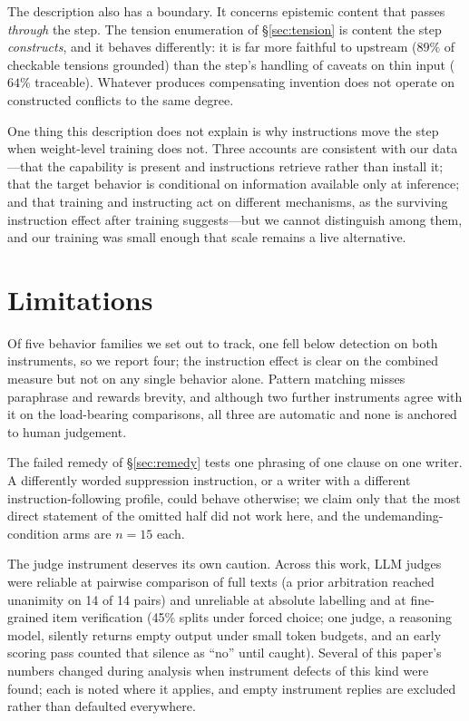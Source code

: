 \documentclass[11pt]{article}
\begin{document}
The description also has a boundary. It concerns epistemic content that
passes \emph{through} the step. The tension enumeration of
\S\ref{sec:tension} is content the step \emph{constructs}, and it behaves
differently: it is far more faithful to upstream ($89\%$ of checkable
tensions grounded) than the step's handling of caveats on thin input ($64\%$
traceable). Whatever produces compensating invention does not operate on
constructed conflicts to the same degree.

One thing this description does not explain is why instructions move the step
when weight-level training does not. Three accounts are consistent with our
data---that the capability is present and instructions retrieve rather than
install it; that the target behavior is conditional on information available
only at inference; and that training and instructing act on different
mechanisms, as the surviving instruction effect after training suggests---but
we cannot distinguish among them, and our training was small enough that scale
remains a live alternative.

\section{Limitations}
\label{sec:limits}
Of five behavior families we set out to track, one fell below detection on
both instruments, so we report four; the instruction effect is clear on the
combined measure but not on any single behavior alone. Pattern matching misses
paraphrase and rewards brevity, and although two further instruments agree
with it on the load-bearing comparisons, all three are automatic and none is
anchored to human judgement.

The failed remedy of \S\ref{sec:remedy} tests one phrasing of one clause on
one writer. A differently worded suppression instruction, or a writer with a
different instruction-following profile, could behave otherwise; we claim only
that the most direct statement of the omitted half did not work here, and the
undemanding-condition arms are $n{=}15$ each.

The judge instrument deserves its own caution. Across this work, LLM judges
were reliable at pairwise comparison of full texts (a prior arbitration
reached unanimity on 14 of 14 pairs) and unreliable at absolute labelling
and at fine-grained item verification (45\% splits under forced choice;
one judge, a reasoning model, silently returns empty output under small
token budgets, and an early scoring pass counted that silence as ``no''
until caught). Several of this paper's numbers changed during analysis when
instrument defects of this kind were found; each is noted where it applies,
and empty instrument replies are excluded rather than defaulted everywhere.
\end{document}

